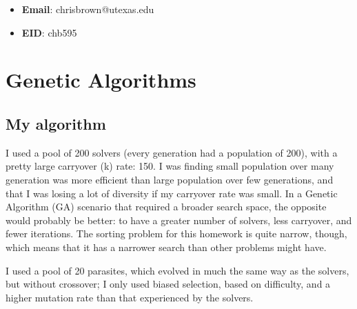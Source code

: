 \documentclass[11pt]{article}
\begin{document}
\begin{itemize}
  \item \textbf{Email}: chrisbrown@utexas.edu
  \item \textbf{EID}: chb595
\end{itemize}

\section{Genetic Algorithms}

\subsection{My algorithm}

I used a pool of 200 solvers (every generation had a population of 200), with a pretty large carryover (k) rate: 150. I was finding small population over many generation was more efficient than large population over few generations, and that I was losing a lot of diversity if my carryover rate was small. In a Genetic Algorithm (GA) scenario that required a broader search space, the opposite would probably be better: to have a greater number of solvers, less carryover, and fewer iterations. The sorting problem for this homework is quite narrow, though, which means that it has a narrower search than other problems might have.

I used a pool of 20 parasites, which evolved in much the same way as the solvers, but without crossover; I only used biased selection, based on difficulty, and a higher mutation rate than that experienced by the solvers.
\end{document}
